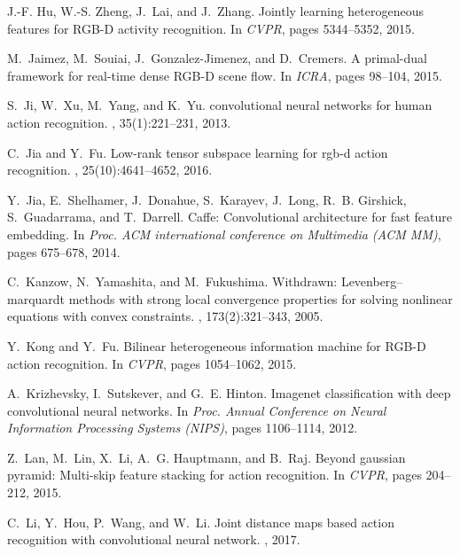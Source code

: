 \documentclass[10pt,twocolumn,letterpaper]{article}
\begin{document}
\begin{thebibliography}{10}
J.-F. Hu, W.-S. Zheng, J.~Lai, and J.~Zhang.
\newblock Jointly learning heterogeneous features for {RGB-D} activity
  recognition.
\newblock In {\em CVPR}, pages 5344--5352, 2015.

M.~Jaimez, M.~Souiai, J.~Gonzalez-Jimenez, and D.~Cremers.
\newblock A primal-dual framework for real-time dense {RGB-D} scene flow.
\newblock In {\em ICRA}, pages 98--104, 2015.

S.~Ji, W.~Xu, M.~Yang, and K.~Yu.
 convolutional neural networks for human action recognition.
, 35(1):221--231, 2013.

C.~Jia and Y.~Fu.
\newblock Low-rank tensor subspace learning for rgb-d action recognition.
, 25(10):4641--4652, 2016.

Y.~Jia, E.~Shelhamer, J.~Donahue, S.~Karayev, J.~Long, R.~B. Girshick,
  S.~Guadarrama, and T.~Darrell.
\newblock Caffe: Convolutional architecture for fast feature embedding.
\newblock In {\em Proc. ACM international conference on Multimedia (ACM MM)},
  pages 675--678, 2014.

C.~Kanzow, N.~Yamashita, and M.~Fukushima.
\newblock Withdrawn: Levenberg--marquardt methods with strong local convergence
  properties for solving nonlinear equations with convex constraints.
,
  173(2):321--343, 2005.

Y.~Kong and Y.~Fu.
\newblock Bilinear heterogeneous information machine for {RGB-D} action
  recognition.
\newblock In {\em CVPR}, pages 1054--1062, 2015.

A.~Krizhevsky, I.~Sutskever, and G.~E. Hinton.
\newblock Imagenet classification with deep convolutional neural networks.
\newblock In {\em Proc. Annual Conference on Neural Information Processing
  Systems (NIPS)}, pages 1106--1114, 2012.

Z.~Lan, M.~Lin, X.~Li, A.~G. Hauptmann, and B.~Raj.
\newblock Beyond gaussian pyramid: Multi-skip feature stacking for action
  recognition.
\newblock In {\em CVPR}, pages 204--212, 2015.

C.~Li, Y.~Hou, P.~Wang, and W.~Li.
\newblock Joint distance maps based action recognition with convolutional
  neural network.
, 2017.


\end{thebibliography}
\end{document}
